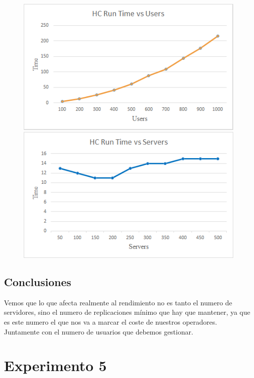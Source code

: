 \documentclass[a4paper,10pt]{report}
\begin{document}
		\begin{figure}[H]
          \includegraphics[width=\linewidth]{images/Run Time vs Users.png}
        \endminipage\hfill
          \includegraphics[width=\linewidth]{images/Run Time vs Servers.png}
        \endminipage
        \end{figure}
		
		\subsection*{Conclusiones}
		Vemos que lo que afecta realmente al rendimiento no es tanto el numero de servidores, sino el numero de replicaciones mínimo que hay que mantener, ya que es este numero el que nos va a marcar el coste de nuestros operadores. Juntamente con el numero de usuarios que debemos gestionar.
		
		
	\newpage
	\section*{Experimento 5}
        
\end{document}
